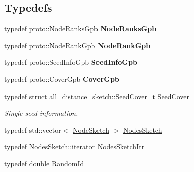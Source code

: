 \subsection*{Typedefs}
\begin{DoxyCompactItemize}
\item 
\hypertarget{namespaceall__distance__sketch_ac0f1ce9ded596e0541b2aa2271df4622}{}typedef proto\+::\+Node\+Ranks\+Gpb {\bfseries Node\+Ranks\+Gpb}\label{namespaceall__distance__sketch_ac0f1ce9ded596e0541b2aa2271df4622}

\item 
\hypertarget{namespaceall__distance__sketch_aa8c53b9bf63c29e404def8714ddab289}{}typedef proto\+::\+Node\+Rank\+Gpb {\bfseries Node\+Rank\+Gpb}\label{namespaceall__distance__sketch_aa8c53b9bf63c29e404def8714ddab289}

\item 
\hypertarget{namespaceall__distance__sketch_aec73a0920772f1a8413d068a6719891a}{}typedef proto\+::\+Seed\+Info\+Gpb {\bfseries Seed\+Info\+Gpb}\label{namespaceall__distance__sketch_aec73a0920772f1a8413d068a6719891a}

\item 
\hypertarget{namespaceall__distance__sketch_af96a1ca9b03281f81f03584343183488}{}typedef proto\+::\+Cover\+Gpb {\bfseries Cover\+Gpb}\label{namespaceall__distance__sketch_af96a1ca9b03281f81f03584343183488}

\item 
typedef struct \hyperlink{structall__distance__sketch_1_1SeedCover__t}{all\+\_\+distance\+\_\+sketch\+::\+Seed\+Cover\+\_\+t} \hyperlink{namespaceall__distance__sketch_a2c159e46ed1a101b68cb2b23a58c4129}{Seed\+Cover}
\begin{DoxyCompactList}\small\item\em Single seed information. \end{DoxyCompactList}\item 
typedef std\+::vector$<$ \hyperlink{classall__distance__sketch_1_1NodeSketch}{Node\+Sketch} $>$ \hyperlink{namespaceall__distance__sketch_aa6fb9f0cba2c34476603e744606c5d6a}{Nodes\+Sketch}
\item 
typedef Nodes\+Sketch\+::iterator \hyperlink{namespaceall__distance__sketch_aeb845b04fceda3cdfb3ee08ebf7c0103}{Nodes\+Sketch\+Itr}
\item 
\hypertarget{namespaceall__distance__sketch_a07dc7ca615a83c4e656f52297eda4bb4}{}typedef double \hyperlink{namespaceall__distance__sketch_a07dc7ca615a83c4e656f52297eda4bb4}{Random\+Id}\label{namespaceall__distance__sketch_a07dc7ca615a83c4e656f52297eda4bb4}


\end{DoxyCompactItemize}
